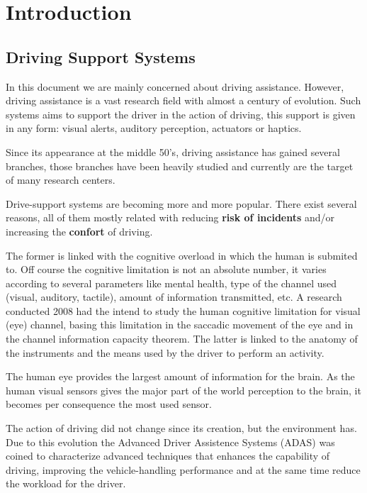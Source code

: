 \section{Introduction}

\subsection{Driving Support Systems}

In this document we are mainly concerned about driving assistance. However, driving assistance is a vast research field with almost a century of evolution. Such systems aims to support the driver in the action of driving, this support is given in any form: visual alerts, auditory perception, actuators or haptics\cite{riener2010sensor}.

Since its appearance at the middle 50's, driving assistance has gained several branches, those branches have been heavily studied and currently are the target of many research centers.

Drive-support systems are becoming more and more popular. There exist several reasons, all of them mostly related with reducing \textbf{risk of incidents} and/or increasing the \textbf{confort} of driving. 

The former is linked with the cognitive overload in which the human is submited to. Off course the cognitive limitation is not an absolute number, it varies according to several parameters like mental health, type of the channel used (visual, auditory, tactile), amount of information transmitted, etc. A research conducted 2008 had the intend to study the human cognitive limitation for visual (eye) channel, basing this limitation in the saccadic movement of the eye and in the channel information capacity theorem\cite{LautarutisV}. The latter is linked to the anatomy of the instruments and the means used by the driver to perform an activity.

The human eye provides the largest amount of information for the brain. As the human visual sensors gives the major part of the world perception to the brain, it becomes per consequence the most used sensor.

The action of driving did not change since its creation, but the environment has. Due to this evolution the Advanced Driver Assistence Systems (ADAS) was coined to characterize advanced techniques that enhances the capability of driving, improving the vehicle-handling performance and at the same time reduce the workload for the driver\cite{riener2010sensor}.

